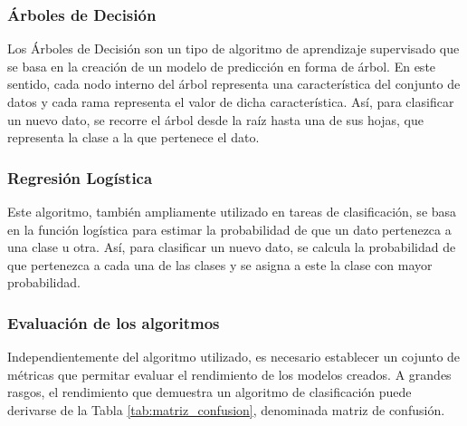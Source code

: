 \subsubsection{Árboles de Decisión}
\label{sec:arboles_decision}

Los Árboles de Decisión son un tipo de algoritmo de aprendizaje supervisado que se basa en la creación de un modelo de predicción en forma de árbol.
En este sentido, cada nodo interno del árbol representa una característica del conjunto de datos y cada rama representa el valor de dicha característica.
Así, para clasificar un nuevo dato, se recorre el árbol desde la raíz hasta una de sus hojas, que representa la clase a la que pertenece el dato.

\subsubsection{Regresión Logística}
\label{sec:regresion_logistica}

Este algoritmo, también ampliamente utilizado en tareas de clasificación, se basa en la
función logística para estimar la probabilidad de que un dato pertenezca a una clase u otra. Así, para clasificar un nuevo dato, se calcula la probabilidad
de que pertenezca a cada una de las clases y se asigna a este la clase con mayor probabilidad.

\subsubsection{Evaluación de los algoritmos}
\label{sec:evaluacion_algoritmos}

Independientemente del algoritmo utilizado, es necesario establecer un cojunto de métricas que permitar evaluar el rendimiento
de los modelos creados. A grandes rasgos, el rendimiento que demuestra un algoritmo de clasificación puede derivarse de la Tabla \ref{tab:matriz_confusion},
denominada matriz de confusión.

\bigskip
\begin{table}[H]
	\centering
	\caption{Matriz de confusión}
	\label{tab:matriz_confusion}
\end{table}

